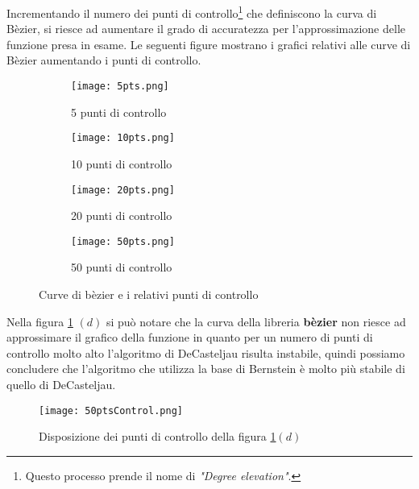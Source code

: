 \documentclass[a4paper,12pt]{report}
\theoremstyle{definition}
\begin{document}
Incrementando il numero dei punti di controllo\footnote{Questo processo prende il nome di \textit{"Degree elevation"}.} che definiscono la curva di Bèzier, si riesce ad aumentare il grado di accuratezza per l'approssimazione delle funzione presa in esame.
Le seguenti figure mostrano i grafici relativi alle curve di Bèzier aumentando i punti di controllo.
\newpage
\begin{figure}[h!]
	\centering
	\begin{subfigure}{0.4\linewidth}
		\texttt{[image: 5pts.png]}
		\caption{5 punti di controllo}
	\end{subfigure}
	\begin{subfigure}{0.4\linewidth}
		\texttt{[image: 10pts.png]}
		\caption{10 punti di controllo}
	\end{subfigure}
	\begin{subfigure}{0.4\linewidth}
		\texttt{[image: 20pts.png]}
		\caption{20 punti di controllo}
	\end{subfigure}
	\begin{subfigure}{0.6\linewidth}
		\texttt{[image: 50pts.png]}
		\caption{50 punti di controllo}
	\end{subfigure}
	\caption{Curve di bèzier e i relativi punti di controllo}
	\label{fig:tavola}
\end{figure} 

Nella figura \ref{fig:tavola} $(d)$ si può notare che la curva della  libreria \textbf{bèzier} non riesce ad approssimare il grafico della funzione in quanto per un numero di punti di controllo molto alto l'algoritmo di DeCasteljau risulta instabile, quindi possiamo concludere che l'algoritmo che utilizza la base di Bernstein è molto più stabile di quello di DeCasteljau.
\begin{figure}[h!t]
	\centering
	\texttt{[image: 50ptsControl.png]}
	\caption{Disposizione dei punti di controllo della figura \ref{fig:tavola}$(d)$}
\end{figure}
\end{document}
